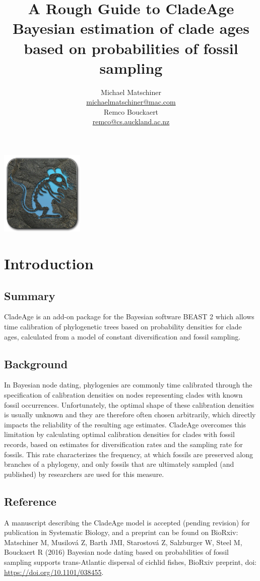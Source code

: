 \documentclass{article}
\title{A Rough Guide to CladeAge\\
{\small Bayesian  estimation of clade ages based on probabilities of fossil sampling}}
\author{Michael Matschiner \\
\href{mailto:michaelmatschiner@mac.com}{michaelmatschiner@mac.com}\vspace{1.5 mm}\\
Remco Bouckaert\\ 
\href{mailto:remco@cs.auckland.ac.nz}{remco@cs.auckland.ac.nz}}
\begin{document}
\maketitle
\begin{center}\includegraphics[width=0.3\textwidth]{cladeage_256x256px.png}\end{center}
\tableofcontents

\section{Introduction}

\subsection{Summary}
CladeAge is an add-on package for the Bayesian software BEAST 2 \citep{Bouckaert:2014ii} which allows time calibration of phylogenetic trees based on probability densities for clade ages, calculated from a model of constant diversification and fossil sampling.

\subsection{Background}
In Bayesian node dating, phylogenies are commonly time calibrated through the specification of calibration densities on nodes representing clades with known fossil occurrences. Unfortunately, the optimal shape of these calibration densities is usually unknown and they are therefore often chosen arbitrarily, which directly impacts the reliability of the resulting age estimates. CladeAge overcomes this limitation by calculating optimal calibration densities for clades with fossil records, based on estimates for diversification rates and the sampling rate for fossils. This rate characterizes the frequency, at which fossils are preserved along branches of a phylogeny, and only fossils that are ultimately sampled (and published) by researchers are used for this measure. 

\subsection{Reference}
A manuscript describing the CladeAge model is accepted (pending revision) for publication in Systematic Biology, and a preprint can be found on BioRxiv:\vspace{1.5 mm} \\
Matschiner M, Musilov\'{a} Z, Barth JMI, Starostov\'{a} Z, Salzburger W, Steel M, Bouckaert R (2016) Bayesian node dating based on probabilities of fossil sampling supports trans-Atlantic dispersal of cichlid fishes, BioRxiv preprint, doi: \href{https://doi.org/10.1101/038455}{https://doi.org/10.1101/038455}.
\end{document}
